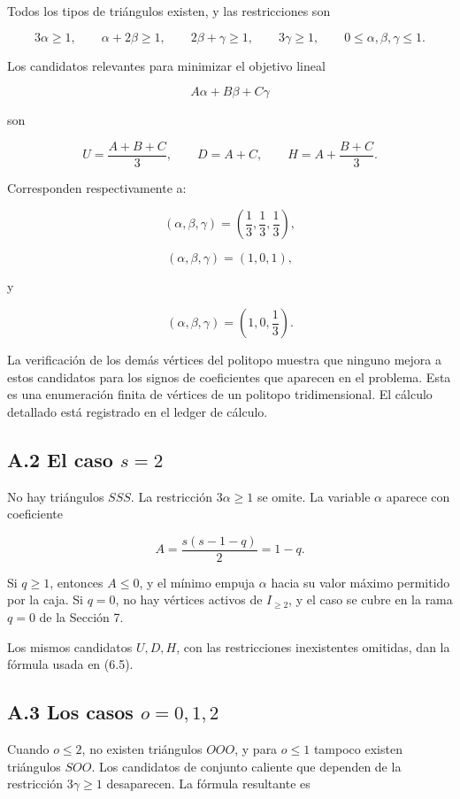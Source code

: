 \documentclass[
  11pt,
]{article}
\begin{document}
Todos los tipos de triángulos existen, y las restricciones son

\[
3\alpha\ge1,\qquad
\alpha+2\beta\ge1,\qquad
2\beta+\gamma\ge1,\qquad
3\gamma\ge1,
\qquad
0\le\alpha,\beta,\gamma\le1.
\]

Los candidatos relevantes para minimizar el objetivo lineal

\[
A\alpha+B\beta+C\gamma
\]

son

\[
U=\frac{A+B+C}{3},
\qquad
D=A+C,
\qquad
H=A+\frac{B+C}{3}.
\]

Corresponden respectivamente a:

\[
(\alpha,\beta,\gamma)=\left(\frac13,\frac13,\frac13\right),
\]

\[
(\alpha,\beta,\gamma)=(1,0,1),
\]

y

\[
(\alpha,\beta,\gamma)=\left(1,0,\frac13\right).
\]

La verificación de los demás vértices del politopo muestra que ninguno
mejora a estos candidatos para los signos de coeficientes que aparecen
en el problema. Esta es una enumeración finita de vértices de un
politopo tridimensional. El cálculo detallado está registrado en el
ledger de cálculo.

\subsection{\texorpdfstring{A.2 El caso
\(s=2\)}{A.2 El caso s=2}}\label{a.2-el-caso-s2}

No hay triángulos \(SSS\). La restricción \(3\alpha\ge1\) se omite. La
variable \(\alpha\) aparece con coeficiente

\[
A=\frac{s(s-1-q)}2=1-q.
\]

Si \(q\ge1\), entonces \(A\le0\), y el mínimo empuja \(\alpha\) hacia su
valor máximo permitido por la caja. Si \(q=0\), no hay vértices activos
de \(I_{\ge2}\), y el caso se cubre en la rama \(q=0\) de la Sección 7.

Los mismos candidatos \(U,D,H\), con las restricciones inexistentes
omitidas, dan la fórmula usada en (6.5).

\subsection{\texorpdfstring{A.3 Los casos
\(o=0,1,2\)}{A.3 Los casos o=0,1,2}}\label{a.3-los-casos-o012}

Cuando \(o\le2\), no existen triángulos \(OOO\), y para \(o\le1\)
tampoco existen triángulos \(SOO\). Los candidatos de conjunto caliente
que dependen de la restricción \(3\gamma\ge1\) desaparecen. La fórmula
resultante es
\end{document}
